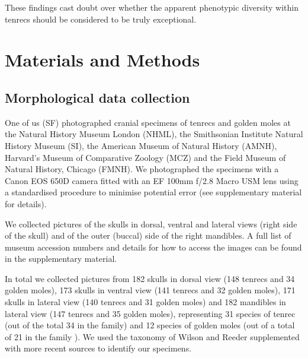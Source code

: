 \documentclass[12pt,a4paper]{article}
\begin{document}
	These findings cast doubt over whether the apparent phenotypic diversity within tenrecs should be considered to be truly exceptional. 


\section{Materials and Methods}

\subsection{Morphological data collection} 

	
	One of us (SF) photographed cranial specimens of tenrecs and golden moles at the Natural History Museum London (NHML), the Smithsonian Institute Natural History Museum (SI), the American Museum of Natural History (AMNH), Harvard's Museum of Comparative Zoology (MCZ) and the Field Museum of Natural History, Chicago (FMNH). We photographed the specimens with a Canon EOS 650D camera fitted with an EF 100mm f/2.8 Macro USM lens using a standardised procedure to minimise potential error (see supplementary material for details). 

	We collected pictures of the skulls in dorsal, ventral and lateral views (right side of the skull) and of the outer (buccal) side of the right mandibles. A full list of museum accession numbers and details for how to access the images can be found in the supplementary material.

	In total we collected pictures from 182 skulls in dorsal view (148 tenrecs and 34 golden moles), 173 skulls in ventral view (141 tenrecs and 32 golden moles), 171 skulls in lateral view (140 tenrecs and 31 golden moles)   and 182 mandibles in lateral view (147 tenrecs and 35 golden moles), representing 31 species of tenrec (out of the total 34 in the family) and 12 species of golden moles (out of a total of 21 in the family \citep{Asher2010}). %
	We used the taxonomy of Wilson and Reeder \citeyearpar{Wilson2005} supplemented with more recent sources \citep{IUCN2012, Olson2013} to identify our specimens. 
	
\end{document}
